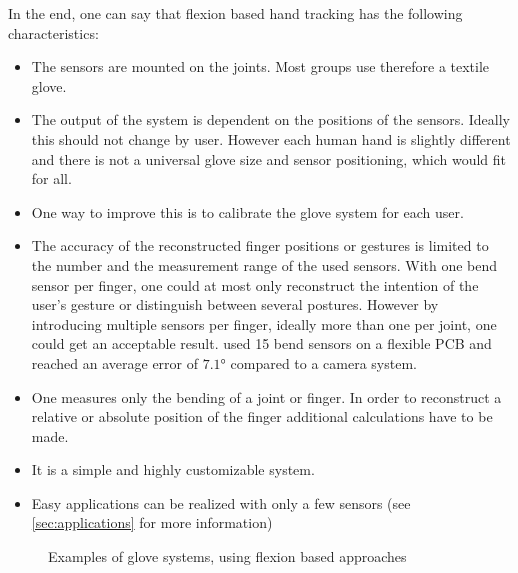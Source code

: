 In the end, one can say that flexion based hand tracking has the following characteristics:\\
\begin{itemize}
\item The sensors are mounted on the joints. Most groups use therefore a textile glove. 
\item The output of the system is dependent on the positions of the sensors. Ideally this should not change by user. However each human hand is slightly different and there is not a universal glove size and sensor positioning, which would fit for all.
\item One way to improve this is to calibrate the glove system for each user.
\item The accuracy of the reconstructed finger positions or gestures is limited to the number and the measurement range of the used sensors. With one bend sensor per finger, one could at most only reconstruct the intention of the user's gesture or distinguish between several postures. However by introducing multiple sensors per finger, ideally more than one per joint, one could get an acceptable result. \cite{zecca2007development} used 15 bend sensors on a flexible PCB and reached an average error of $ \ang{7.1} $  compared to a camera system.
\item One measures only the bending of a joint or finger. In order to reconstruct a relative or absolute position of the finger additional calculations have to be made.
\item It is a simple and highly customizable system.
\item Easy applications can be realized with only a few sensors (see \ref{sec:applications} for more information)
\end{itemize}

\begin{figure}[h]
	\hfill
	\hfill
	
	\caption[Flexion based glove systems]{Examples of glove systems, using flexion based approaches}
	\label{fig:examplesFlexion}
\end{figure}


